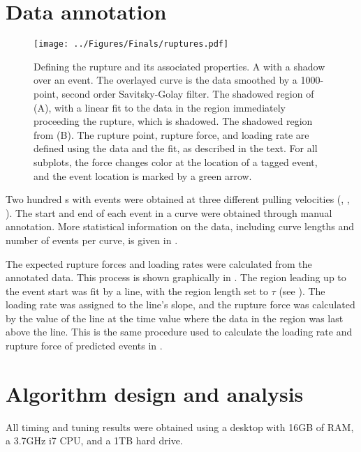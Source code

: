 \section{Data annotation}


\begin{figure}[htpb]
\caption[Definition of rupture force and loading rate]{ Defining the rupture and its associated properties.  A \fec{} with a shadow over an event. The overlayed curve is the data smoothed by a 1000-point, second order Savitsky-Golay filter.  The shadowed region of (A), with a linear fit to the data in the region immediately proceeding the rupture, which is shadowed.  The shadowed region from (B). The rupture point, rupture force, and loading rate are defined using the data and the fit, as described in the text. For all subplots, the force changes color at the location of a tagged event, and the event location is marked by a green arrow. }
\centering
\texttt{[image: ../Figures/Finals/ruptures.pdf]}%
\end{figure}

Two hundred \fec{}s with events were obtained at three different pulling velocities (, , ). The start and end of each event in a curve were obtained through manual annotation. More statistical information on the data, including curve lengths and number of events per curve, is given in .

The expected rupture forces and loading rates were calculated from the annotated data. This process is shown graphically in . The region leading up to the event start was fit by a line, with the region length set to $\tau$ (see ). The loading rate was assigned to the line's slope, and the rupture force was calculated by the value of the line at the time value where the data in the region was last above the line. This is the same procedure used to calculate the loading rate and rupture force of predicted events in . 



\section{Algorithm design and analysis}

All timing and tuning results were obtained using a desktop with 16GB of RAM, a 3.7GHz i7 CPU, and a 1TB hard drive. 

